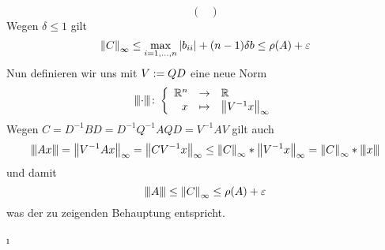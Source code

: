 \begin{exercisePage}
\begin{equation*}
\begin{pmatrix}
		\end{pmatrix}
	\end{equation*}
	Wegen $\delta \leq 1$ gilt
	\begin{equation*}
		\norm{C}_\infty \leq \max_{i=1, \dots , n} \abs{b_{ii}} + (n-1)\delta b \leq \rho(A) + \epsilon
	\end{equation*}
	Nun definieren wir uns mit $V \defeq QD$ eine neue Norm
	\begin{equation*}
		\bigabb{\Norm{\cdot}}{\R^n}{\R}%
		{x}{\norm{V^{-1} x}_\infty}
	\end{equation*}
	Wegen $C = D^{-1} B D = D^{-1} Q^{-1} A Q D = V^{-1} A V$ gilt auch
	\begin{equation*}
		\Norm{Ax} = \norm{V^{-1}Ax}_\infty = \norm{CV^{-1}x}_\infty \leq \norm{C}_\infty * \norm{V^{-1}x}_\infty = \norm{C}_\infty * \Norm{x}
	\end{equation*}
	und damit
	\begin{equation*}
		\Norm{A} \leq \norm{C}_\infty \leq \rho(A) + \epsilon
	\end{equation*}
	was der zu zeigenden Behauptung entspricht.
\end{exercisePage}

\undef\cnorm
\undef\i
\undef\Norm